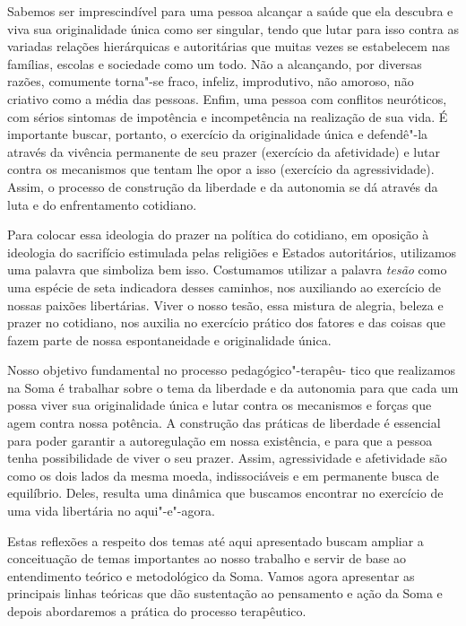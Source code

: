 Sabemos ser imprescindível para uma pessoa alcançar a saúde que ela
descubra e viva sua originalidade única como ser singular, tendo que
lutar para isso contra as variadas relações hierárquicas e autoritárias
que muitas vezes se estabelecem nas famílias, escolas e sociedade como
um todo. Não a alcançando, por diversas razões, comumente torna"-se
fraco, infeliz, improdutivo, não amoroso, não criativo como a média das
pessoas. Enfim, uma pessoa com conflitos neuróticos, com sérios sintomas
de impotência e incompetência na realização de sua vida. É importante
buscar, portanto, o exercício da originalidade única e defendê"-la
através da vivência permanente de seu prazer (exercício da afetividade)
e lutar contra os mecanismos que tentam lhe opor a isso (exercício da
agressividade). Assim, o processo de construção da liberdade e da
autonomia se dá através da luta e do enfrentamento cotidiano.

Para colocar essa ideologia do prazer na política do cotidiano, em
oposição à ideologia do sacrifício estimulada pelas religiões e Estados
autoritários, utilizamos uma palavra que simboliza bem isso. Costumamos
utilizar a palavra \emph{tesão} como uma espécie de seta indicadora
desses caminhos, nos auxiliando ao exercício de nossas paixões
libertárias. Viver o nosso tesão, essa mistura de alegria, beleza e
prazer no cotidiano, nos auxilia no exercício prático dos fatores e das
coisas que fazem parte de nossa espontaneidade e originalidade única.

Nosso objetivo fundamental no processo pedagógico"-terapêu- tico que
realizamos na Soma é trabalhar sobre o tema da liberdade e da autonomia
para que cada um possa viver sua originalidade única e lutar contra os
mecanismos e forças que agem contra nossa potência. A construção das
práticas de liberdade é essencial para poder garantir a autoregulação em
nossa existência, e para que a pessoa tenha possibilidade de viver o seu
prazer. Assim, agressividade e afetividade são como os dois lados da
mesma moeda, indissociáveis e em permanente busca de equilíbrio. Deles,
resulta uma dinâmica que buscamos encontrar no exercício de uma vida
libertária no aqui"-e"-agora.

Estas reflexões a respeito dos temas até aqui apresentado buscam ampliar
a conceituação de temas importantes ao nosso trabalho e servir de base
ao entendimento teórico e metodológico da Soma. Vamos agora apresentar
as principais linhas teóricas que dão sustentação ao pensamento e ação
da Soma e depois abordaremos a prática do processo terapêutico.

